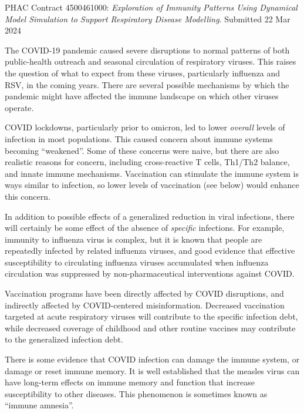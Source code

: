 

PHAC Contract 4500461000: \emph{Exploration of Immunity Patterns Using Dynamical
Model Simulation to Support Respiratory Disease
Modelling}. Submitted 22 Mar 2024


The COVID-19 pandemic caused severe disruptions to normal patterns of both public-health outreach and seasonal circulation of respiratory viruses. This raises the question of what to expect from these viruses, particularly influenza and RSV, in the coming years. There are several possible mechanisms by which the pandemic might have affected the immune landscape on which other viruses operate.


COVID lockdowns, particularly prior to omicron, led to lower \emph{overall} levels of infection in most populations. This caused concern about immune systems becoming “weakened”. Some of these concerns were naive, but there are also realistic reasons for concern, including cross-reactive T cells, Th1/Th2 balance, and innate immune mechanisms. Vaccination can stimulate the immune system is ways similar to infection, so lower levels of vaccination (see below) would enhance this concern.


In addition to possible effects of a generalized reduction in viral infections, there will certainly be some effect of the absence of \emph{specific} infections. 
For example, immunity to influenza virus is complex, but it is known that people are repeatedly infected by related influenza viruses, and good evidence that effective susceptibility to circulating influenza viruses accumulated when influenza circulation was suppressed by non-pharmaceutical interventions against COVID.


Vaccination programs have been directly affected by COVID disruptions, and indirectly affected by COVID-centered misinformation. Decreased vaccination targeted at acute respiratory viruses will contribute to the specific infection debt, while decreased coverage of childhood and other routine vaccines may contribute to the generalized infection debt.


There is some evidence that COVID infection can damage the immune system, or damage or reset immune memory. 
It is well established that the measles virus can have long-term effects on immune memory and function that increase susceptibility to other diseases. This phenomenon is sometimes known as “immune amnesia”.

